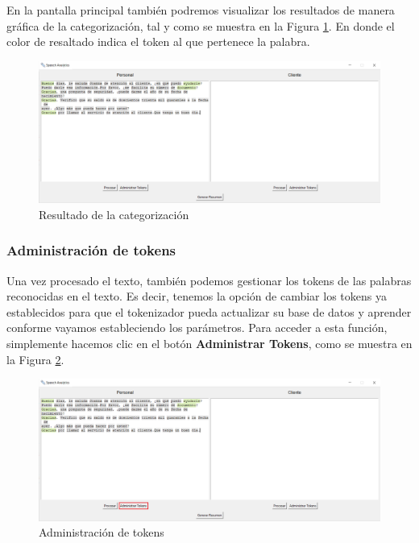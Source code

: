 \documentclass[10pt,times,twocolumn]{article}
\begin{document}
En la pantalla principal también podremos visualizar los resultados de manera gráfica de la categorización, tal y como se muestra en la Figura \ref{fig:graf_atc_paso5}. En donde el color de resaltado indica el token al que pertenece la palabra.

\begin{figure}[H]
    \centering
    \includegraphics[width=\linewidth]{fig/ATC_paso5.png}
    \caption{Resultado de la categorización}
    \label{fig:graf_atc_paso5}
\end{figure}

\subsubsection{Administración de tokens}
Una vez procesado el texto, también podemos gestionar los tokens de las palabras reconocidas en el texto. Es decir, tenemos la opción de cambiar los tokens ya establecidos para que el tokenizador pueda actualizar su base de datos y aprender conforme vayamos estableciendo los parámetros. Para acceder a esta función, simplemente hacemos clic en el botón \textbf{Administrar Tokens}, como se muestra en la Figura \ref{fig:graf_atc_paso6}.

\begin{figure}[H]
    \centering
    \includegraphics[width=\linewidth]{fig/ATC_paso6.png}
    \caption{Administración de tokens}
    \label{fig:graf_atc_paso6}
\end{figure}
\end{document}
